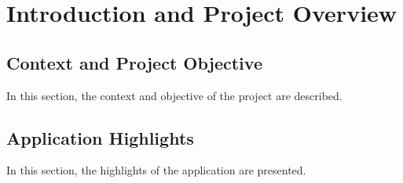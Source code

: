 \chapter{Introduction and Project Overview}

\section{Context and Project Objective}

In this section, the context and objective of the project are described.

\section{Application Highlights}

In this section, the highlights of the application are presented.